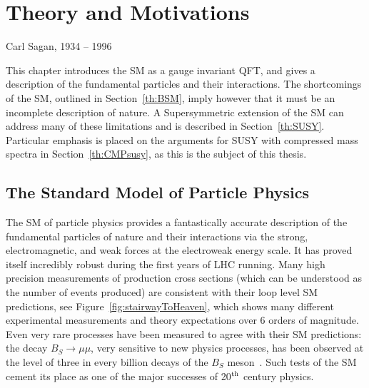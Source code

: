 \chapter{Theory and Motivations}
\label{chap:theory}




{Carl Sagan, 1934 -- 1996}%


This chapter introduces the \ac{SM} as a gauge invariant \ac{QFT}, and gives a description of the fundamental particles and their interactions.
The shortcomings of the \ac{SM}, outlined in Section~\ref{th:BSM}, imply however that it must be an incomplete description of nature. 
A Supersymmetric extension of the SM can address many of these limitations and is described in Section~\ref{th:SUSY}. 
Particular emphasis is placed on the arguments for \ac{SUSY} with compressed mass spectra in Section~\ref{th:CMPsusy}, as this is the subject of this thesis.

\section{The Standard Model of Particle Physics \label{th:sm}}

The \ac{SM} of particle physics provides a fantastically accurate description of the fundamental particles of nature and their interactions via the strong, electromagnetic, and weak forces at the electroweak energy scale.
It has proved itself incredibly robust during the first years of \ac{LHC} running. 
Many high precision measurements of production cross sections (which can be understood as the number of events produced) are consistent with their loop level \ac{SM} predictions, see Figure~\ref{fig:stairwayToHeaven}, 
which shows many different experimental measurements and theory expectations  over 6 orders of magnitude.
Even very rare processes have been measured to agree with their \ac{SM} predictions: the decay $B_{S}\rightarrow \mu\mu$, very sensitive to new physics processes, has been observed at the level of three in every billion decays of the $B_{S}$ meson~\cite{BSmumuCombo}.
Such tests of the \ac{SM} cement its place as one of the major successes of 20$^{\rm th}$ century physics.


